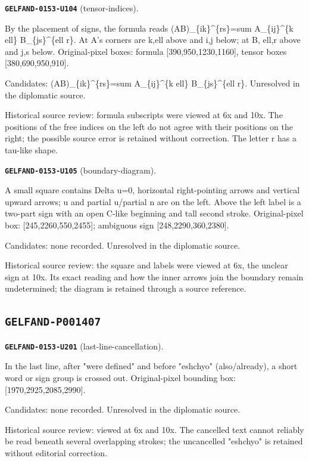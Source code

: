 \par\noindent\leavevmode{}\label{GELFAND-0153-U104}\textbf{\texttt{GELFAND-0153-U104}} (tensor-indices).\nopagebreak[4]\par
By the placement of signs, the formula reads (AB)\_\{ik\}\textasciicircum{}\{rs\}=sum A\_\{ij\}\textasciicircum{}\{k ell\} B\_\{js\}\textasciicircum{}\{ell r\}. At A's corners are k,ell above and i,j below; at B, ell,r above and j,s below. Original-pixel boxes: formula [390,950,1230,1160], tensor boxes [380,690,950,910].\par
Candidates: (AB)\_\{ik\}\textasciicircum{}\{rs\}=sum A\_\{ij\}\textasciicircum{}\{k ell\} B\_\{js\}\textasciicircum{}\{ell r\}. Unresolved in the diplomatic source.\par
Historical source review: formula subscripts were viewed at 6x and 10x. The positions of the free indices on the left do not agree with their positions on the right; the possible source error is retained without correction. The letter r has a tau-like shape.\par\medskip
\par\noindent\leavevmode{}\label{GELFAND-0153-U105}\textbf{\texttt{GELFAND-0153-U105}} (boundary-diagram).\nopagebreak[4]\par
A small square contains Delta u=0, horizontal right-pointing arrows and vertical upward arrows; u and partial u/partial n are on the left. Above the left label is a two-part sign with an open C-like beginning and tall second stroke. Original-pixel box: [245,2260,550,2455]; ambiguous sign [248,2290,360,2380].\par
Candidates: none recorded. Unresolved in the diplomatic source.\par
Historical source review: the square and labels were viewed at 6x, the unclear sign at 10x. Its exact reading and how the inner arrows join the boundary remain undetermined; the diagram is retained through a source reference.\par\medskip
\subsection*{\texttt{GELFAND-P001407}}
\par\noindent\leavevmode{}\label{GELFAND-0153-U201}\textbf{\texttt{GELFAND-0153-U201}} (last-line-cancellation).\nopagebreak[4]\par
In the last line, after "were defined" and before "eshchyo" (also/already), a short word or sign group is crossed out. Original-pixel bounding box: [1970,2925,2085,2990].\par
Candidates: none recorded. Unresolved in the diplomatic source.\par
Historical source review: viewed at 6x and 10x. The cancelled text cannot reliably be read beneath several overlapping strokes; the uncancelled "eshchyo" is retained without editorial correction.\par\medskip
